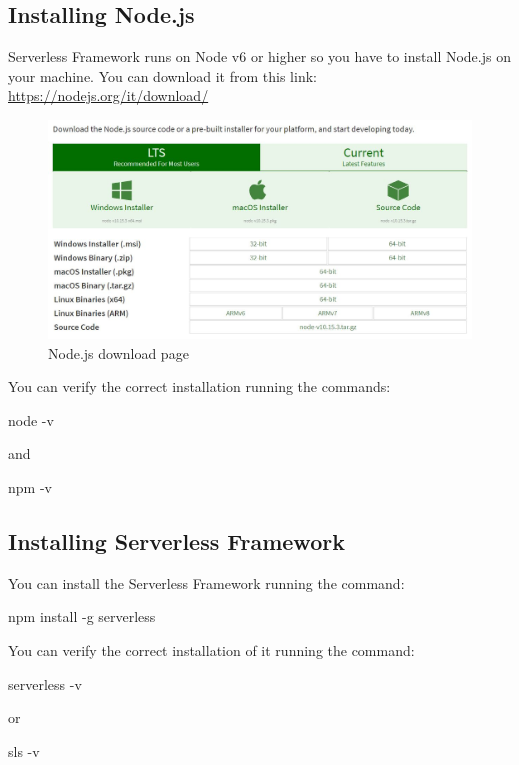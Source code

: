 \newpage
{}
\subsection{Installing Node.js}
Serverless Framework runs on Node v6 or higher so you have to install Node.js on your machine.
You can download it from this link: \url{https://nodejs.org/it/download/}
\begin{figure}[H]
		\centering
		\includegraphics[scale=0.5]{../Img/node}
		\caption{Node.js download page}\label{}
\end{figure}
You can verify the correct installation running the commands:
\begin{ttfamily}node -v\end{ttfamily} and \begin{ttfamily}npm -v\end{ttfamily}
	
\subsection{Installing Serverless Framework}
You can install the Serverless Framework running the command:\begin{ttfamily} npm install -g serverless\end{ttfamily}
You can verify the correct installation of it running the command: \begin{ttfamily} serverless -v \end{ttfamily} or \\ \begin{ttfamily} sls -v\end{ttfamily}

